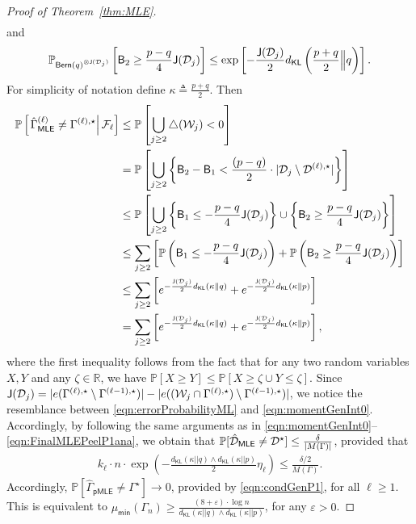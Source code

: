 \documentclass[12pt]{article}
\newcommand {\pr} {\mathbb{P}}
\newcommand{\calD}{{\cal D}}
\newcommand{\calF}{{\cal F}}
\newcommand{\calW}{{\cal W}}
\newcommand{\p}[1]{\left(#1\right)}
\newcommand{\pp}[1]{\left[#1\right]}
\newcommand{\ppp}[1]{\left\{#1\right\}}
\newcommand{\s}[1]{\mathsf{#1}}
\begin{document}
\begin{proof}[Proof of Theorem~\ref{thm:MLE}]
\begin{align}
\end{align}
and
\begin{align}
    \pr_{\s{Bern}(q)^{\otimes\s{J}(\calD_j)}}\pp{\s{B}_2\geq\frac{p-q}{4}\s{J}(\calD_j)}\leq \exp\pp{-\frac{\s{J}(\calD_j)}{2}d_{\s{KL}}\p{\frac{p+q}{2}\Big\| q}}.
\end{align}
For simplicity of notation define $\kappa\triangleq\frac{p+q}{2}$. Then
\begin{align}
    \pr\pp{\left.\hat{\Gamma}^{(\ell)}_{\s{MLE}}\neq{\Gamma}^{(\ell),\star}\right|\calF_\ell}&\leq\pr\pp{\bigcup_{j\geq2}\triangle(\calW_j)<0}\\
    &=\pr\pp{\bigcup_{j\geq2}\ppp{\s{B}_2-\s{B}_1<\frac{(p-q)}{2}\cdot |\calD_j\setminus\calD^{(\ell),\star}|}}\\
    &\leq \pr\pp{\bigcup_{j\geq2}\ppp{\s{B}_1\leq-\frac{p-q}{4}\s{J}(\calD_j)}\cup\ppp{\s{B}_2\geq\frac{p-q}{4}\s{J}(\calD_j)}}\\
    &\leq \sum_{j\geq2}\pp{\pr\p{\s{B}_1\leq-\frac{p-q}{4}\s{J}(\calD_j)}+\pr\p{\s{B}_2\geq\frac{p-q}{4}\s{J}(\calD_j)}}\\
    &\leq\sum_{j\geq2}\pp{e^{-\frac{\s{J}(\calD_j)}{2}d_{\s{KL}}\p{\kappa\parallel q}}+e^{-\frac{\s{J}(\calD_j)}{2}d_{\s{KL}}\p{\kappa\parallel p}}}\\
    & = \sum_{j\geq2}\pp{e^{-\frac{\s{J}(\calD_j)}{2}d_{\s{KL}}\p{\kappa\parallel q}}+e^{-\frac{\s{J}(\calD_j)}{2}d_{\s{KL}}\p{\kappa\parallel p}}},\label{eqn:errorProbabilityML}
\end{align}
where the first inequality follows from the fact that for any two random variables $X,Y$ and any $\zeta\in\mathbb{R}$, we have $\pr[X\geq Y]\leq\pr[X\geq\zeta\cup Y\leq\zeta]$. Since $\s{J}(\calD_j) = |e(\Gamma^{(\ell),\star} \setminus \Gamma^{(\ell-1),\star})|-|e((\calW_j\cap\Gamma^{(\ell),\star})\setminus\Gamma^{(\ell-1),\star})|$, we notice the resemblance between \eqref{eqn:errorProbabilityML} and \eqref{eqn:momentGenInt0}. Accordingly, by following the same arguments as in \eqref{eqn:momentGenInt0}--\eqref{eqn:FinalMLEPeelP1ana}, we obtain that $\pr[\hat{\calD}_{\s{MLE}}\neq\calD^{\star}]\leq\frac{\delta}{|M(\Gamma)|}$, provided that 
\begin{align}
    k_\ell \cdot n\cdot\exp\p{-\frac{d_{\s{KL}}(\kappa||q)\wedge d_{\s{KL}}(\kappa||p)}{2}\eta_\ell}\leq \frac{\delta/2}{M(\Gamma)}.\label{eqn:condGenP1}
\end{align}
Accordingly, $\pr[\hat{\Gamma}_{\s{pMLE}}\neq\Gamma^{\star}]\to0$, 
provided by \eqref{eqn:condGenP1}, for all $\ell\geq1$. This is equivalent to $\mu_{\s{min}}(\Gamma_n)\geq \frac{(8+\varepsilon)\cdot \log n}{d_{\s{KL}}(\kappa||q)\wedge d_{\s{KL}}(\kappa||p)}$, for any $\varepsilon>0$.
\end{proof}
\end{document}
